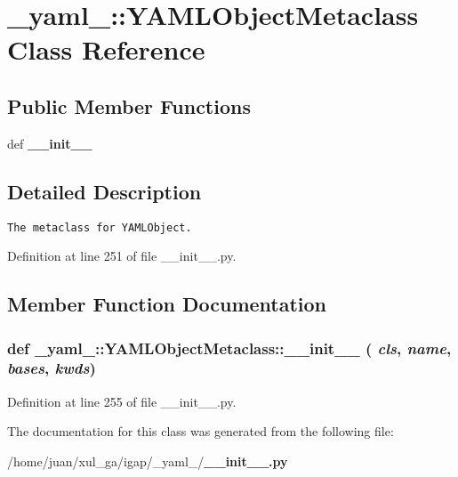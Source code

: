 \section{\_\-yaml\_\-::YAMLObjectMetaclass Class Reference}
\label{class__yaml___1_1YAMLObjectMetaclass}
\subsection*{Public Member Functions}
\begin{CompactItemize}
\item 
def {\bf \_\-\_\-init\_\-\_\-}
\end{CompactItemize}


\subsection{Detailed Description}


\footnotesize\begin{verbatim}
The metaclass for YAMLObject.
\end{verbatim}
\normalsize
 

Definition at line 251 of file \_\-\_\-init\_\-\_\-.py.

\subsection{Member Function Documentation}
\subsubsection{\setlength{\rightskip}{0pt plus 5cm}def \_\-yaml\_\-::YAMLObjectMetaclass::\_\-\_\-init\_\-\_\- ( {\em cls},  {\em name},  {\em bases},  {\em kwds})}\label{class__yaml___1_1YAMLObjectMetaclass_1f6cddba91652b1a01b7a4d5db841ed5}




Definition at line 255 of file \_\-\_\-init\_\-\_\-.py.

The documentation for this class was generated from the following file:\begin{CompactItemize}
\item 
/home/juan/xul\_\-ga/igap/\_\-yaml\_\-/{\bf \_\-\_\-init\_\-\_\-.py}\end{CompactItemize}
